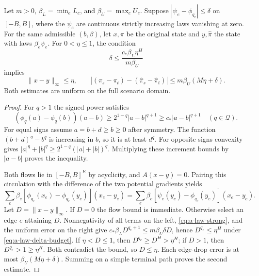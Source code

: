 \begin{lemma}
\label{lem:a-law-state-error}
Let $m>0$, $\beta_L=\min_e L_e$, and $\beta_U=\max_e U_e$. Suppose
$|\psi_e-\phi_{q_e}|\le\delta$ on $[-B,B]$, where the $\psi_e$ are
continuous strictly increasing laws vanishing at zero. For the same
admissible $(b,\beta)$, let $x,\pi$ be the original state and $y,\widehat\pi$
the state with laws $\beta_e\psi_e$. For $0<\eta\le1$, the condition
\begin{equation}
 \delta\le\frac{c_*\beta_L\eta^H}{m\beta_U}
 \label{eq:a-law-delta-budget}
\end{equation}
implies
\begin{equation}
 \|x-y\|_\infty\le\eta,\qquad
 |(\pi_s-\pi_t)-(\widehat\pi_s-\widehat\pi_t)|
       \le m\beta_U(M\eta+\delta).
 \label{eq:a-law-state-error}
\end{equation}
Both estimates are uniform on the full scenario domain.
\end{lemma}
\begin{proof}
For $q>1$ the signed power satisfies
\begin{equation}
 (\phi_q(a)-\phi_q(b))(a-b)
              \ge2^{1-q}|a-b|^{q+1}
              \ge c_*|a-b|^{q+1}\quad(q\in\mathcal Q).
 \label{eq:a-law-strong}
\end{equation}
For equal signs assume $a=b+d\ge b\ge0$ after symmetry. The function
$(b+d)^q-b^q$ is increasing in $b$, so it is at least $d^q$.
For opposite signs convexity gives
$|a|^q+|b|^q\ge2^{1-q}(|a|+|b|)^q$. Multiplying these increment bounds
by $|a-b|$ proves the inequality.

Both flows lie in $[-B,B]^E$ by acyclicity, and $A(x-y)=0$.
Pairing this circulation with the difference of the two potential
gradients yields
\[
 \sum_e\beta_e[\phi_{q_e}(x_e)-\phi_{q_e}(y_e)](x_e-y_e)
 =\sum_e\beta_e[\psi_e(y_e)-\phi_{q_e}(y_e)](x_e-y_e).
\]
Let $D=\|x-y\|_\infty$. If $D=0$ the flow bound is immediate. Otherwise
select an edge $e$ attaining $D$. Nonnegativity of all terms on the
left, \cref{eq:a-law-strong}, and the uniform error on the right give
$c_*\beta_L D^{q_e+1}\le m\beta_U\delta D$, hence
$D^{q_e}\le\eta^H$ under \cref{eq:a-law-delta-budget}.
If $\eta<D\le1$, then $D^{q_e}\ge D^H>\eta^H$;
if $D>1$, then $D^{q_e}>1\ge\eta^H$. Both contradict the bound,
so $D\le\eta$. Each edge-drop error is at most
$\beta_U(M\eta+\delta)$. Summing on a simple terminal path proves the
second estimate.
\end{proof}


